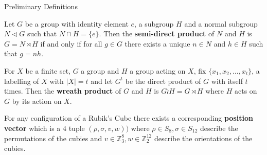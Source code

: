 \documentclass[final]{beamer}
\newlength{\colwidth}
\begin{document}
\begin{frame}[t]
\begin{columns}[t]
\begin{column}{\colwidth}



  \begin{alertblock}{Preliminary Definitions}


     Let $G$ be a group with identity element $e$, a subgroup $H$ and a normal subgroup $N \triangleleft G$ such that $N \cap H = \{e\}$.
    Then the \textbf{semi-direct product} of $N$ and $H$ is $G = N \rtimes H$ if and only if for all $g \in G$ there exists a unique $n \in N$ and $h \in H$ such that $g = nh$.


For $X$ be a finite set, $G$ a group and $H$ a group acting on $X$,
fix $\{x_1,x_2, \dots, x_t\}$, a labelling of $X$ with $| X | = t$ and
let $G^t$ be the direct product of $G$ with itself $t$ times.
Then the \textbf{wreath product} of $G$ and $H$ is $G \wr H = G \rtimes H$ where $H$ acts on $G$ by its action on $X$.







For any configuration of a Rubik's Cube there exists a corresponding \textbf{position vector} which is a $4$ tuple $(\rho, \sigma, v, w))$ where $\rho \in S_8, \sigma \in S_{12}$ describe the permutations of the cubies and $v \in \mathbb{Z}_3^8, w \in \mathbb{Z}_2^{12}$ describe the orientations of the cubies.


\end{alertblock}
\end{column}
\end{columns}
\end{frame}
\end{document}
